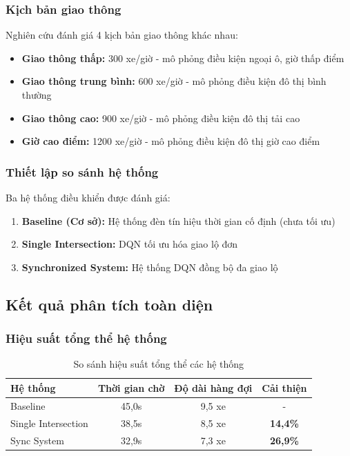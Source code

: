 \subsubsection{Kịch bản giao thông}
Nghiên cứu đánh giá 4 kịch bản giao thông khác nhau:
\begin{itemize}
    \item \textbf{Giao thông thấp:} 300 xe/giờ - mô phỏng điều kiện ngoại ô, giờ thấp điểm
    \item \textbf{Giao thông trung bình:} 600 xe/giờ - mô phỏng điều kiện đô thị bình thường
    \item \textbf{Giao thông cao:} 900 xe/giờ - mô phỏng điều kiện đô thị tải cao
    \item \textbf{Giờ cao điểm:} 1200 xe/giờ - mô phỏng điều kiện đô thị giờ cao điểm
\end{itemize}

\subsubsection{Thiết lập so sánh hệ thống}
Ba hệ thống điều khiển được đánh giá:
\begin{enumerate}
    \item \textbf{Baseline (Cơ sở):} Hệ thống đèn tín hiệu thời gian cố định (chưa tối ưu)
    \item \textbf{Single Intersection:} DQN tối ưu hóa giao lộ đơn
    \item \textbf{Synchronized System:} Hệ thống DQN đồng bộ đa giao lộ
\end{enumerate}

\subsection{Kết quả phân tích toàn diện}

\subsubsection{Hiệu suất tổng thể hệ thống}

\begin{table}[!htp]
    \centering
    \caption{So sánh hiệu suất tổng thể các hệ thống}
    \label{tab:overall_system_performance}
    \begin{tabular}{@{}lccc@{}}
        \toprule 
        \textbf{Hệ thống} & \textbf{Thời gian chờ} & \textbf{Độ dài hàng đợi} & \textbf{Cải thiện} \\
        \midrule 
        Baseline & 45,0s & 9,5 xe & - \\
        Single Intersection & 38,5s & 8,5 xe & \textbf{14,4\%} \\
        Sync System & 32,9s & 7,3 xe & \textbf{26,9\%} \\
        \bottomrule
    \end{tabular}
\end{table}

